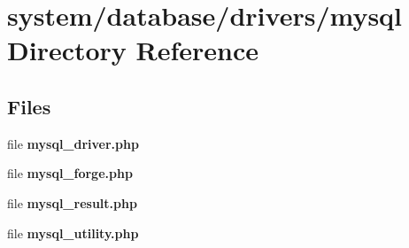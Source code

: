 \section{system/database/drivers/mysql Directory Reference}
\label{dir_6ead3397c534477048b45bbe58282792}
\subsection*{Files}
\begin{DoxyCompactItemize}
\item 
file {\bf mysql\-\_\-driver.\-php}
\item 
file {\bf mysql\-\_\-forge.\-php}
\item 
file {\bf mysql\-\_\-result.\-php}
\item 
file {\bf mysql\-\_\-utility.\-php}
\end{DoxyCompactItemize}
